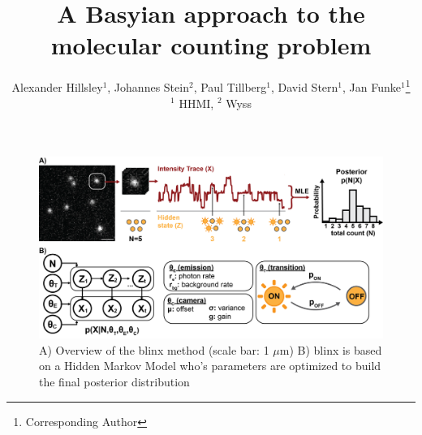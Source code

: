 \documentclass[twocolumn]{article}
\begin{document}
\title{A Basyian approach to the molecular counting problem}

\author{
  Alexander Hillsley$^{1}$,
  Johannes Stein$^{2}$,
  Paul Tillberg$^{1}$,
  David Stern$^{1}$,
  Jan Funke$^{1}$\thanks{Corresponding Author}

  \normalsize{$^1$ HHMI},
  \normalsize{$^2$ Wyss}
}

\maketitle





\begin{figure}
  \includegraphics[width=\linewidth]{figures/blinx_overview.png}
  \caption{A) Overview of the blinx method (scale bar: 1 $\mu$m) B) blinx is based on a Hidden Markov Model who's parameters are optimized to build the final posterior
  distribution}
  \label{fig:method:overview}
\end{figure}


\end{document}
